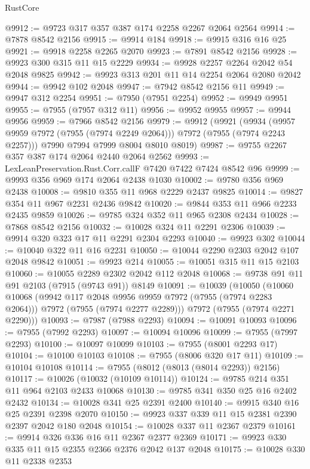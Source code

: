 \begin{lexlean}{RustCore}
\begin{coremodule}
@9912 := @9723 @317 @357 @387 @174 @2258 @2267 @2064 @2564
@9914 := @7878 @8542 @2156
@9915 := @9914 @184
@9918 := @9915 @316 @16 @25
@9921 := @9918 @2258 @2265 @2070
@9923 := @7891 @8542 @2156
@9928 := @9923 @300 @315 @11 @15 @2229
@9934 := @9928 @2257 @2264 @2042 @54 @2048 @9825
@9942 := @9923 @313 @201 @11 @14 @2254 @2064 @2080 @2042
@9944 := @9942 @102 @2048
@9947 := @7942 @8542 @2156 @11
@9949 := @9947 @312 @2254
@9951 := @7950 (@7951 @2254)
@9952 := @9949 @9951
@9955 := @7955 (@7957 @312 @11)
@9956 := @9952 @9955
@9957 := @9944 @9956
@9959 := @7966 @8542 @2156
@9979 := @9912
    (@9921
      (@9934 (@9957 @9959 @7972 (@7955 (@7974 @2249 @2064))) @7972 (@7955 (@7974 @2243 @2257)))
      @7990
      @7994
      @7999
      @8004
      @8010
      @8019)
@9987 := @9755 @2267 @357 @387 @174 @2064 @2440 @2064 @2562
@9993 := LexLeanPreservation.Rust.Corr.callF @7420 @7422 @7424 @8542 @96
@9999 := @9993 @356 @969 @174 @2064 @2438 @1030
@10002 := @9780 @356 @969 @2438
@10008 := @9810 @355 @11 @968 @2229 @2437 @9825
@10014 := @9827 @354 @11 @967 @2231 @2436 @9842
@10020 := @9844 @353 @11 @966 @2233 @2435 @9859
@10026 := @9785 @324 @352 @11 @965 @2308 @2434
@10028 := @7868 @8542 @2156
@10032 := @10028 @324 @11 @2291 @2306
@10039 := @9914 @320 @323 @17 @11 @2291 @2304 @2293
@10040 := @9923 @302
@10044 := @10040 @322 @11 @16 @2231
@10050 := @10044 @2290 @2303 @2042 @107 @2048 @9842
@10051 := @9923 @214
@10055 := @10051 @315 @11 @15 @2103
@10060 := @10055 @2289 @2302 @2042 @112 @2048
@10068 := @9738 @91 @11 @91 @2103 (@7915 (@9743 @91)) @8149
@10091 := @10039
    (@10050
      (@10060
        @10068
        (@9942 @117 @2048 @9956 @9959 @7972 (@7955 (@7974 @2283 @2064)))
        @7972
        (@7955 (@7974 @2277 @2289)))
      @7972
      (@7955 (@7974 @2271 @2290)))
@10093 := @7987 (@7988 @2293)
@10094 := @10091 @10093
@10096 := @7955 (@7992 @2293)
@10097 := @10094 @10096
@10099 := @7955 (@7997 @2293)
@10100 := @10097 @10099
@10103 := @7955 (@8001 @2293 @17)
@10104 := @10100 @10103
@10108 := @7955 (@8006 @320 @17 @11)
@10109 := @10104 @10108
@10114 := @7955 (@8012 (@8013 (@8014 @2293)) @2156)
@10117 := @10026 (@10032 (@10109 @10114))
@10124 := @9785 @214 @351 @11 @964 @2103 @2433 @10068
@10130 := @9785 @341 @350 @25 @16 @2402 @2432
@10134 := @10028 @341 @25 @2391 @2400
@10140 := @9915 @340 @16 @25 @2391 @2398 @2070
@10150 := @9923 @337 @339 @11 @15 @2381 @2390 @2397 @2042 @180 @2048
@10154 := @10028 @337 @11 @2367 @2379
@10161 := @9914 @326 @336 @16 @11 @2367 @2377 @2369
@10171 := @9923 @330 @335 @11 @15 @2355 @2366 @2376 @2042 @137 @2048
@10175 := @10028 @330 @11 @2338 @2353

\end{coremodule}
\end{lexlean}

